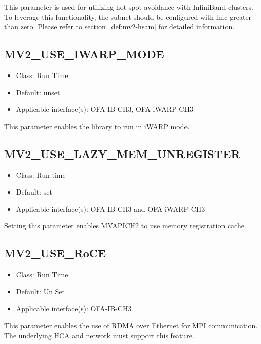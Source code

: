 This parameter is used for utilizing hot-spot avoidance with InfiniBand
clusters. To leverage this functionality, the subnet should be
configured with lmc greater than zero. Please refer to
section~\ref{def:mv2-hsam} for detailed information.

\subsection{MV2\_USE\_IWARP\_MODE}
\label{def:mv2-enable-iwarp-mode}
\begin{itemize}
    \item Class: Run Time
    \item Default: unset
    \item Applicable interface(s): OFA-IB-CH3, OFA-iWARP-CH3
\end{itemize}
This parameter enables the library to run in iWARP mode. 

\subsection{MV2\_USE\_LAZY\_MEM\_UNREGISTER}
\label{def:mv2_use_lazy_mem_unregister}
\begin{itemize}
    \item Class: Run time
    \item Default: set
    \item Applicable interface(s): OFA-IB-CH3 and OFA-iWARP-CH3
\end{itemize}
Setting this parameter enables MVAPICH2 to use memory registration cache.

%

\subsection{MV2\_USE\_RoCE}
\label{def:mv2-use-roce}
\begin{itemize}
    \item Class: Run Time
    \item Default: Un Set
    \item Applicable interface(s): OFA-IB-CH3
\end{itemize}
This parameter enables the use of RDMA over Ethernet for MPI communication.
The underlying HCA and network must support this feature.


